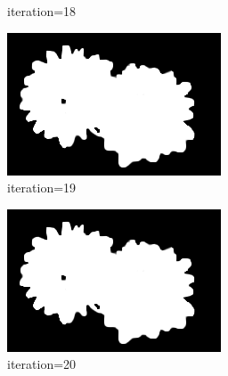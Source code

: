 \documentclass{article}
\begin{document}
\begin{figure}[t]
\begin{subfigure}[t]{0.19\textwidth}
\vspace{-0.6cm}
\caption{iteration=18}
\end{subfigure}
\begin{subfigure}[t]{0.19\textwidth}
\centering
\includegraphics[width=\textwidth]{./images/marginals_iter_19.png}
\vspace{-0.6cm}
\caption{iteration=19}
\end{subfigure}
\begin{subfigure}[t]{0.19\textwidth}
\centering
\includegraphics[width=\textwidth]{./images/marginals_iter_20.png}
\vspace{-0.6cm}
\caption{iteration=20}
\end{subfigure}
\begin{subfigure}[t]{0.19\textwidth}
\centering

\end{subfigure}
\end{figure}
\end{document}
